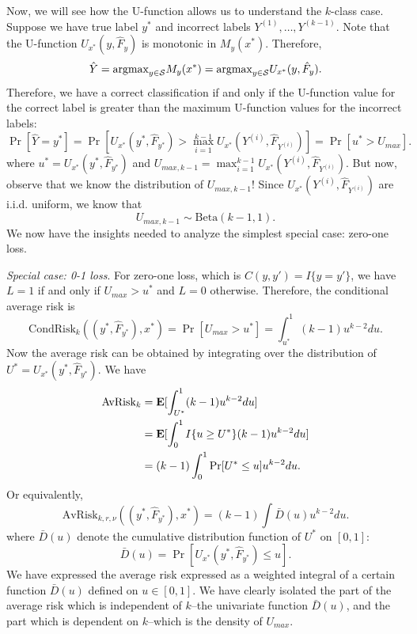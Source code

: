 Now, we will see how the U-function allows us to understand the
$k$-class case.  Suppose we have true label $y^*$ and incorrect labels
$Y^{(1)},\hdots, Y^{(k-1)}$.  Note that the U-function
$U_{x^*}(y, \hat{F}_y)$ is monotonic in $M_y(x^*)$.  Therefore,
\[
\hat{Y} = \text{argmax}_{y \in \mathcal{S}} M_y(x^*) = \text{argmax}_{y \in \mathcal{S}} U_{x^*}(y, \hat{F}_y).
\]
Therefore, we have a correct classification if and only if the U-function value for the correct label
is greater than the maximum U-function values for the incorrect labels:
\[
\Pr[\hat{Y} = y^*] = \Pr[U_{x^*}(y^*, \hat{F}_{y^*}) > \max_{i=1}^{k-1} U_{x^*}(Y^{(i)}, \hat{F}_{Y^{(i)}})] =  \Pr[u^* > U_{max}].
\]
where $u^* = U_{x^*}(y^*, \hat{F}_{y^*})$ and $U_{max, k-1}
= \max_{i=1}^{k-1} U_{x^*}(Y^{(i)}, \hat{F}_{Y^{(i)}})$.  But now,
observe that we know the distribution of $U_{max, k-1}$!  Since
$U_{x^*}(Y^{(i)}, \hat{F}_{Y^{(i)}})$ are i.i.d. uniform, we know that
\begin{equation}\label{eq:umax_beta}
U_{max, k-1} \sim \text{Beta}(k-1, 1). 
\end{equation}
We now have the insights needed to analyze the simplest special case: zero-one loss.
\newline

\noindent \emph{Special case: 0-1 loss}.
For zero-one loss, which is $C(y, y') = I\{y = y'\}$, we have $L=1$ if
and only if $U_{max} > u^*$ and $L=0$ otherwise.  Therefore, the
conditional average risk is
\[
\text{CondRisk}_k((y^*, \hat{F}_{y^*}), x^*) = \Pr[U_{max} > u^*] = \int_{u^*}^1 (k-1) u^{k-2} du.
\]
Now the average risk can be obtained by integrating over the distribution of $U^* = U_{x^*}(y^*, \hat{F}_{y^*})$.
We have
\begin{align*}
\text{AvRisk}_k &= \textbf{E}[ \int_{U^*}^1 (k-1) u^{k-2} du] 
\\&= \textbf{E}[\int_0^1 I\{u \geq U^*\} (k-1) u^{k-2} du ]
\\&= (k-1) \int_0^1 \Pr[U^* \leq u] u^{k-2} du.
\end{align*}
Or equivalently,
\[
\text{AvRisk}_{k, r, \nu}((y^*, \hat{F}_{y^*}), x^*) = (k-1) \int \bar{D}(u) u^{k-2} du.
\]
where $\bar{D}(u)$ denote the cumulative distribution function of $U^*$ on $[0,1]$:
\[
\bar{D}(u) = \Pr[U_{x^*}(y^*, \hat{F}_{y^*}) \leq u].
\]
We have expressed the average risk expressed as a weighted integral of
a certain function $\bar{D}(u)$ defined on $u \in [0,1]$.  We have
clearly isolated the part of the average risk which is independent of
$k$--the univariate function $\bar{D}(u)$, and the part which is
dependent on $k$--which is the density of $U_{max}$.


